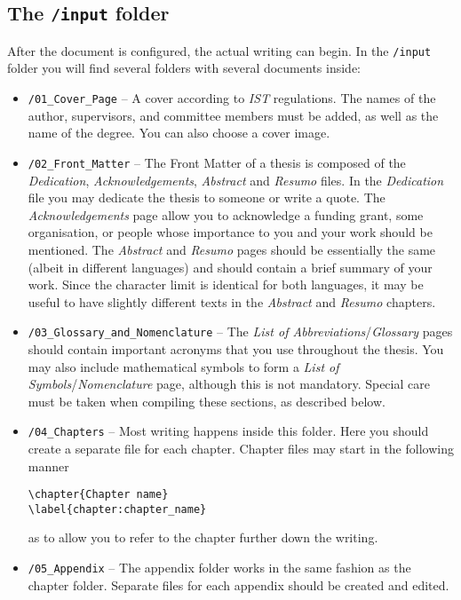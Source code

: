 \subsection{The {\normalfont\texttt{/input}} folder} %

After the document is configured, the actual writing can begin. In the \texttt{/input} folder you will find several folders with several documents inside:

\begin{itemize}
\item \texttt{/01\_Cover\_Page} -- A cover according to \textit{IST} regulations. The names of the author, supervisors, and committee members must be added, as well as the name of the degree. You can also choose a cover image.

\item \texttt{/02\_Front\_Matter} -- The Front Matter of a thesis is composed of the \textit{Dedication}, \textit{Acknowledgements}, \textit{Abstract} and \textit{Resumo} files. In the \textit{Dedication} file you may dedicate the thesis to someone or write a quote. The \textit{Acknowledgements} page allow you to acknowledge a funding grant, some organisation, or people whose importance to you and your work should be mentioned. The \textit{Abstract} and \textit{Resumo} pages should be essentially the same (albeit in different languages) and should contain a brief summary of your work. Since the character limit is identical for both languages, it may be useful to have slightly different texts in the \textit{Abstract} and \textit{Resumo} chapters.

\item \texttt{/03\_Glossary\_and\_Nomenclature} -- The \textit{List of Abbreviations}/\textit{Glossary} pages should contain important acronyms that you use throughout the thesis. You may also include mathematical symbols to form a \textit{List of Symbols}/\textit{Nomenclature} page, although this is not mandatory. Special care must be taken when compiling these sections, as described below.

\item \texttt{/04\_Chapters} -- Most writing happens inside this folder. Here you should create a separate file for each chapter. Chapter files may start in the following manner

\begin{verbatim}
\chapter{Chapter name}
\label{chapter:chapter_name}
\end{verbatim}


\noindent as to allow you to refer to the chapter further down the writing.

\item \texttt{/05\_Appendix} -- The appendix folder works in the same fashion as the chapter folder. Separate files for each appendix should be created and edited.
\end{itemize}

